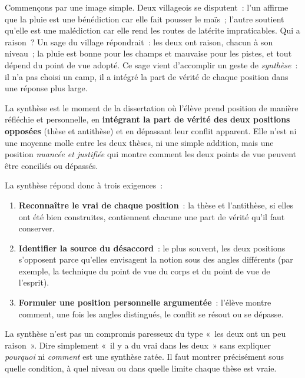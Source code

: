 \documentclass[11pt]{article}
\newcommand{\cle}[1]{{\popxbold\color{popdark}#1}}
\newcounter{popsec}
\newcounter{popsub}
\newcommand{\courssub}[1]{%
  \stepcounter{popsub}%
  \par\vspace{9pt}\noindent{\popxbold\fontsize{11.5}{13}\selectfont\color{popink}{\color{poporange}\thepopsec.\thepopsub}\hspace{6pt}#1}\par\nopagebreak\vspace{4pt}
}
\begin{document}
\courssub{Définition et rôle de la synthèse}

Commençons par une image simple. Deux villageois se disputent~: l'un affirme que la pluie est une bénédiction car elle fait pousser le maïs~; l'autre soutient qu'elle est une malédiction car elle rend les routes de latérite impraticables. Qui a raison~? Un sage du village répondrait~: les deux ont raison, chacun à son niveau~; la pluie est bonne pour les champs et mauvaise pour les pistes, et tout dépend du point de vue adopté. Ce sage vient d'accomplir un geste de \emph{synthèse}~: il n'a pas choisi un camp, il a intégré la part de vérité de chaque position dans une réponse plus large.

\begin{definition}[La synthèse]
La \cle{synthèse} est le moment de la dissertation où l'élève prend position de manière réfléchie et personnelle, en \textbf{intégrant la part de vérité des deux positions opposées} (thèse et antithèse) et en dépassant leur conflit apparent. Elle n'est ni une moyenne molle entre les deux thèses, ni une simple addition, mais une position \emph{nuancée et justifiée} qui montre comment les deux points de vue peuvent être conciliés ou dépassés.
\end{definition}

La synthèse répond donc à trois exigences~:
\begin{enumerate}
\item \textbf{Reconnaître le vrai de chaque position}~: la thèse et l'antithèse, si elles ont été bien construites, contiennent chacune une part de vérité qu'il faut conserver.
\item \textbf{Identifier la source du désaccord}~: le plus souvent, les deux positions s'opposent parce qu'elles envisagent la notion sous des angles différents (par exemple, la technique du point de vue du corps et du point de vue de l'esprit).
\item \textbf{Formuler une position personnelle argumentée}~: l'élève montre comment, une fois les angles distingués, le conflit se résout ou se dépasse.
\end{enumerate}

\begin{attention}
La synthèse n'est pas un compromis paresseux du type «~les deux ont un peu raison~». Dire simplement «~il y a du vrai dans les deux~» sans expliquer \emph{pourquoi} ni \emph{comment} est une synthèse ratée. Il faut montrer précisément sous quelle condition, à quel niveau ou dans quelle limite chaque thèse est vraie.
\end{attention}
\end{document}

